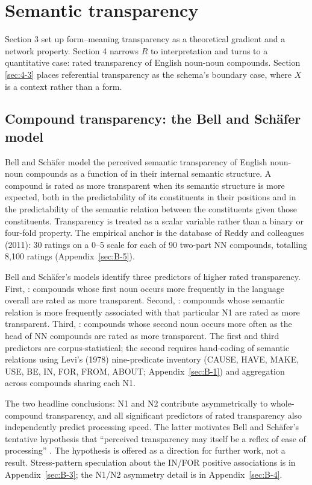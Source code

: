 \section{Semantic transparency}\label{sec:4}

Section 3 set up form--meaning transparency as a theoretical gradient and a network property. Section 4 narrows $R$ to interpretation and turns to a quantitative case: rated transparency of English noun-noun compounds. Section \ref{sec:4-3} places referential transparency as the schema's boundary case, where $X$ is a context rather than a form.

\subsection{Compound transparency: the Bell and Schäfer model}

Bell and Schäfer \autocite*{bell-schafer-2016-modelling-transparency} model the perceived semantic transparency of English noun-noun compounds as a function of  in their internal semantic structure. A compound is rated as more transparent when its semantic structure is more expected, both in the predictability of its constituents in their positions and in the predictability of the semantic relation between the constituents given those constituents. Transparency is treated as a scalar variable rather than a binary or four-fold property. The empirical anchor is the database of Reddy and colleagues (2011): 30 ratings on a 0--5 scale for each of 90 two-part NN compounds, totalling 8,100 ratings (Appendix~\ref{sec:B-5}).

Bell and Schäfer's models identify three predictors of higher rated transparency. First, : compounds whose first noun occurs more frequently in the language overall are rated as more transparent. Second, : compounds whose semantic relation is more frequently associated with that particular \textup{N1} are rated as more transparent. Third, : compounds whose second noun occurs more often as the head of NN compounds are rated as more transparent. The first and third predictors are corpus-statistical; the second requires hand-coding of semantic relations using Levi's (1978) nine-predicate inventory (CAUSE, HAVE, MAKE, USE, BE, IN, FOR, FROM, ABOUT; Appendix~\ref{sec:B-1}) and aggregation across compounds sharing each \textup{N1}.

The two headline conclusions: \textup{N1} and \textup{N2} contribute asymmetrically to whole-compound transparency, and all significant predictors of rated transparency also independently predict processing speed. The latter motivates Bell and Schäfer's tentative hypothesis that \enquote{perceived transparency may itself be a reflex of ease of processing} \autocite[157]{bell-schafer-2016-modelling-transparency}. The hypothesis is offered as a direction for further work, not a result. Stress-pattern speculation about the IN/FOR positive associations is in Appendix~\ref{sec:B-3}; the \textup{N1}/\textup{N2} asymmetry detail is in Appendix~\ref{sec:B-4}.


